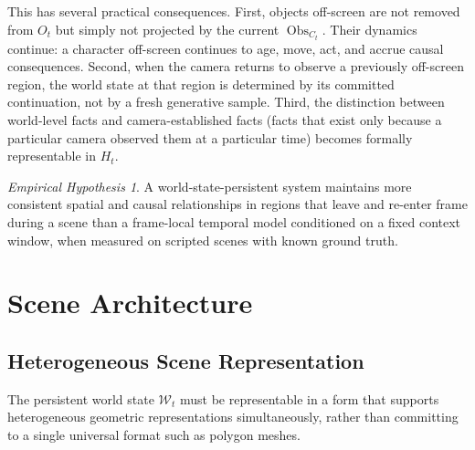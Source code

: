 \documentclass[11pt,a4paper]{article}
\theoremstyle{plain}
\theoremstyle{definition}
\theoremstyle{remark}
\newtheorem{hypothesis}[theorem]{Empirical Hypothesis}
\DeclareMathOperator{\Obs}{Obs}
\begin{document}
This has several practical consequences. First, objects off-screen are not removed from $O_t$ but simply not projected by the current $\Obs_{C_t}$. Their dynamics continue: a character off-screen continues to age, move, act, and accrue causal consequences. Second, when the camera returns to observe a previously off-screen region, the world state at that region is determined by its committed continuation, not by a fresh generative sample. Third, the distinction between world-level facts and camera-established facts (facts that exist only because a particular camera observed them at a particular time) becomes formally representable in $H_t$.

\begin{hypothesis}
\label{hyp:offscreen}
A world-state-persistent system maintains more consistent spatial and causal relationships in regions that leave and re-enter frame during a scene than a frame-local temporal model conditioned on a fixed context window, when measured on scripted scenes with known ground truth.
\end{hypothesis}

\section{Scene Architecture}
\label{sec:scene}

\subsection{Heterogeneous Scene Representation}

The persistent world state $\mathcal{W}_t$ must be representable in a form that supports heterogeneous geometric representations simultaneously, rather than committing to a single universal format such as polygon meshes.
\end{document}
